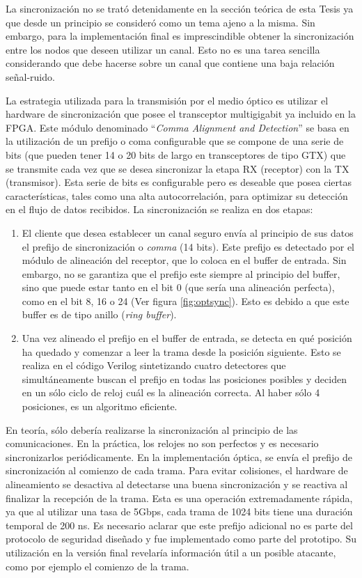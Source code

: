 La sincronización no se trató detenidamente en la sección teórica de esta Tesis ya que desde un principio se consideró como un tema ajeno a la misma. Sin embargo, para la implementación final es imprescindible obtener la sincronización entre los nodos que deseen utilizar un canal. Esto no es una tarea sencilla considerando que debe hacerse sobre un canal que contiene una baja relación señal-ruido.

La estrategia utilizada para la transmisión por el medio óptico es utilizar el hardware de sincronización que posee el transceptor multigigabit ya incluido en la FPGA. Este módulo \cite{ug198} denominado ``\textit{Comma Alignment and Detection}'' se basa en la utilización de un prefijo o coma configurable que se compone de una serie de bits (que pueden tener 14 o 20 bits de largo en transceptores de tipo GTX) que se transmite cada vez que se desea sincronizar la etapa RX (receptor) con la TX (transmisor). Esta serie de bits es configurable pero es deseable que posea ciertas características, tales como una alta autocorrelación, para optimizar su detección en el flujo de datos recibidos.
La sincronización se realiza en dos etapas:
\begin{enumerate}
 \item El cliente que desea establecer un canal seguro envía al principio de sus datos el prefijo de sincronización o \textit{comma} (14 bits). Este prefijo es detectado por el módulo de alineación del receptor, que lo coloca en el buffer de entrada. Sin embargo, no se garantiza que el prefijo este siempre al principio del buffer, sino que puede estar tanto en el bit 0 (que sería una alineación perfecta), como en el bit 8, 16 o 24 (Ver figura \ref{fig:optsync}). Esto es debido a que este buffer es de tipo anillo (\textit{ring buffer}).
 \item Una vez alineado el prefijo en el buffer de entrada, se detecta en qué posición ha quedado y comenzar a leer la trama desde la posición siguiente. Esto se realiza en el código Verilog sintetizando cuatro detectores que simultáneamente buscan el prefijo en todas las posiciones posibles y deciden en un sólo ciclo de reloj cuál es la alineación correcta. Al haber sólo 4 posiciones, es un algoritmo eficiente.
\end{enumerate}

En teoría, sólo debería realizarse la sincronización al principio de las comunicaciones. En la práctica, los relojes no son perfectos y es necesario sincronizarlos periódicamente. En la implementación óptica, se envía el prefijo de sincronización al comienzo de cada trama.
Para evitar colisiones, el hardware de alineamiento se desactiva al detectarse una buena sincronización y se reactiva al finalizar la recepción de la trama. Esta es una operación extremadamente rápida, ya que al utilizar una tasa de 5Gbps, cada trama de 1024 bits tiene una duración temporal de 200 ns. Es necesario aclarar que este prefijo adicional no es parte del protocolo de seguridad diseñado y fue implementado como parte del prototipo. Su utilización en la versión final revelaría información útil a un posible atacante, como por ejemplo el comienzo de la trama.

